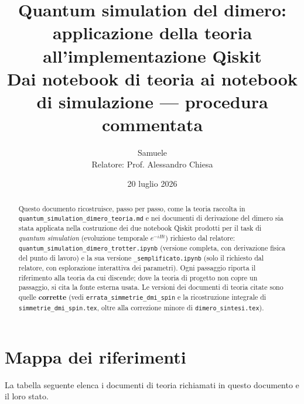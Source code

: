 \documentclass[11pt,a4paper]{article}
\title{Quantum simulation del dimero: applicazione della teoria\\
all'implementazione Qiskit\\[6pt]
\large Dai notebook di teoria ai notebook di simulazione --- procedura commentata}
\author{Samuele \\ Relatore: Prof. Alessandro Chiesa}
\date{20 luglio 2026}
\begin{document}
\maketitle

\begin{abstract}
\noindent Questo documento ricostruisce, passo per passo, come la teoria
raccolta in \texttt{quantum\_simulation\_dimero\_teoria.md} e nei documenti
di derivazione del dimero sia stata applicata nella costruzione dei due
notebook Qiskit prodotti per il task di \emph{quantum simulation} (evoluzione
temporale $e^{-iHt}$) richiesto dal relatore:
\texttt{quantum\_simulation\_dimero\_trotter.ipynb} (versione completa, con
derivazione fisica del punto di lavoro) e la sua versione
\texttt{\_semplificato.ipynb} (solo il richiesto dal relatore, con
esplorazione interattiva dei parametri). Ogni passaggio riporta il
riferimento alla teoria da cui discende; dove la teoria di progetto non
copre un passaggio, si cita la fonte esterna usata. Le versioni dei
documenti di teoria citate sono quelle \textbf{corrette} (vedi
\texttt{errata\_simmetrie\_dmi\_spin} e la ricostruzione integrale di
\texttt{simmetrie\_dmi\_spin.tex}, oltre alla correzione minore di
\texttt{dimero\_sintesi.tex}).
\end{abstract}

\tableofcontents

\section{Mappa dei riferimenti}

La tabella seguente elenca i documenti di teoria richiamati in questo
documento e il loro stato.
\end{document}
